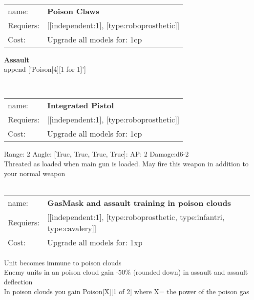 \ \\
\begin{tabular}{ll}
name: & {\bf Poison Claws } \\
Requiers: & [[independent:1], [type:roboprosthetic]] \\
Cost: & Upgrade all models for: 1cp \\
\end{tabular}





{\bf Assault} \ \\

append ['Poison[4][1 for 1]']


\ \\
\begin{tabular}{ll}
name: & {\bf Integrated Pistol } \\
Requiers: & [[independent:1], [type:roboprosthetic]] \\
Cost: & Upgrade all models for: 1cp \\
\end{tabular}



Range: 2  Angle: [True, True, True, True]: AP: 2 Damage:d6-2 \\
Threated as loaded when main gun is loaded. May fire this weapon in addition to your normal weapon\\ 








\ \\
\begin{tabular}{ll}
name: & {\bf GasMask and assault training in poison clouds } \\
Requiers: & [[independent:1], [type:roboprosthetic, type:infantri, type:cavalery]] \\
Cost: & Upgrade all models for: 1xp \\
\end{tabular}

Unit becomes immune to poison clouds\\ 
Enemy units in an poison cloud gain -50\% (rounded down) in assault and assault deflection\\ 
In poison clouds you gain Poison[X][1 of 2] where X= the power of the poison gas\\ 









